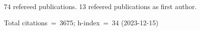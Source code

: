 74 refereed publications. 13 refeered publications as first author.

Total citations~=~3675; h-index~=~34 (2023-12-15)